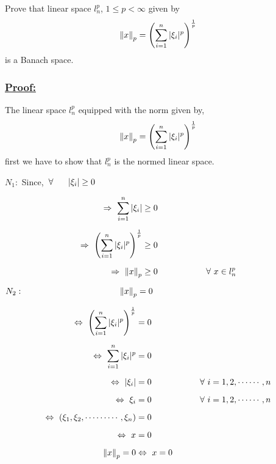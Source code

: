 \documentclass[a4paper,12pt]{article}
\begin{document}
    Prove that linear space $l^{p}_n$, $1\leq p < \infty$ given by 
    \[\norm{x}_p = \left(\sum_{i=1}^{n}|\xi_i|^p\right)^{\frac{1}{p}}\] is a Banach space.

    \vspace*{0.5cm}

    \subsubsection*{\underline{{\bf Proof:}}}

    The linear space $l^{p}_n$ equipped with the norm given by,
    \[\norm{x}_p = \left(\sum_{i=1}^{n}|\xi_i|^p\right)^{\frac{1}{p}}\]
    first we have to show that $l^{p}_n$ is the normed linear space.

    \vspace*{0.5cm}

    $N_1:$ \hspace*{4cm} Since,\  $\forall\ \hspace*{0.5cm} |\xi_{i}| \geq 0$

    \begin{equation*}
        \begin{split}
            \Rightarrow\ \sum_{i=1}^{n} |\xi_{i}| & \geq 0\\[2mm]
            \Rightarrow\ \left(\sum_{i=1}^{n}|\xi_i|^p\right)^{\frac{1}{p}} & \geq 0\\[2mm]
            \Rightarrow\ \norm{x}_p & \geq 0 \hspace*{2cm} \forall\ x\in l^{p}_n
        \end{split}
    \end{equation*}

    \vspace*{0.5cm}

    $N_2:\hspace*{4cm} \norm{x}_p = 0$

    \begin{equation*}
        \begin{split}
            \Leftrightarrow\ \left(\sum_{i=1}^{n}|\xi_i|^p\right)^{\frac{1}{p}} & = 0\\[2mm]
            \Leftrightarrow\ \sum_{i=1}^{n} |\xi_{i}|^p & = 0\\[2mm]
            \Leftrightarrow\ |\xi_{i}| & = 0 \hspace*{2cm} \forall\ i = 1, 2, \cdots \cdots , n\\[2mm]
            \Leftrightarrow\ \xi_{i} & = 0 \hspace*{2cm} \forall\ i = 1, 2, \cdots \cdots , n\\[2mm]
            \Leftrightarrow\ \left(\xi_1, \xi_2, \cdots \cdots \cdots, \xi_n\right) & = 0\\[2mm]
            \Leftrightarrow\ x & = 0\\[2mm]
            \norm{x}_p = 0 & \Leftrightarrow\ x = 0
        \end{split}
    \end{equation*}
    
\end{document}
